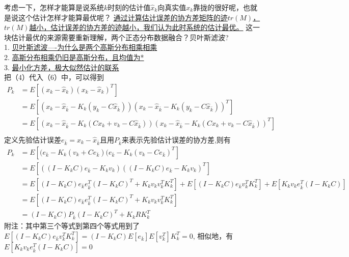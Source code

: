 \documentclass[UTF8,a4paper,10pt]{ctexart}
\begin{document}
    考虑一下，怎样才能算是说系统$k$时刻的估计值$\hat{x}_k$向真实值$x_k$靠拢的很好呢，也就是说这个估计怎样才能算最优呢？
    \uline{通过计算估计误差的协方差矩阵的迹$tr(M)$，$tr(M)$越小，估计误差的协方差的迹越小，我们认为此时系统的估计最优。}
    这一块估计最优的来源需要重新理解，两个正态分布数据融合？贝叶斯滤波?\\    
    1. \href{https://blog.csdn.net/varyshare/article/details/97642209}{贝叶斯滤波----为什么是两个高斯分布相乘相乘}\\
    2. \href{https://blog.csdn.net/michaelhan3/article/details/85453368}{高斯分布相乘仍旧是高斯分布，且均值为*}\\
    3. \href{https://zhuanlan.zhihu.com/p/105496881}{最小化方差，极大似然估计的联系}\\

    把（4）代入（6）中，可以得到
    \begin{equation}
        \begin{aligned}
            P_k &= E[(x_k - \hat{x}_k)(x_k - \hat{x}_k)^T]\\
              &= E[(x_k - \hat{x}_{\bar{k}} - K_k(y_k- C\hat{x}_{\bar{k}})) (x_k - \hat{x}_{\bar{k}} - K_k(y_k- C\hat{x}_{\bar{k}}))^T]\\
              &= E[(x_k - \hat{x}_{\bar{k}} - K_k(Cx_{k} + v_{k}- C\hat{x}_{\bar{k}})) (x_k - \hat{x}_{\bar{k}} - K_k(Cx_{k} + v_{k}- C\hat{x}_{\bar{k}}))^T]\\
        \end{aligned}
    \end{equation}
    定义先验估计误差$e_{\bar{k}} = x_k - \hat{x}_{\bar{k}}$且用$P_{\bar{k}}$来表示先验估计误差的协方差,则有
    \begin{equation}
        \begin{aligned}
            P_k  & = E[(e_{\bar{k}} - K_k(v_k + Ce_{\bar{k}}) (e_{\bar{k}} - K_k(v_k- Ce_{\bar{k}})^T]\\
                  & = E[((I-K_kC)e_{\bar{k}} -K_kv_k) ((I-K_kC)e_{\bar{k}} -K_kv_k)^T]\\
                  & = E[(I-K_kC)e_{\bar{k}}e^T_{\bar{k}}(I-K_kC)^T +  K_kv_kv^T_kK^T_k]
                    + E[(I-K_kC)e_{\bar{k}}v^T_k K^T_k] + E[K_kv_ke^T_{\bar{k}}(I-K_kC)]\\
                  & = E[(I-K_kC)e_{\bar{k}}e^T_{\bar{k}}(I-K_kC)^T +  K_kv_kv^T_kK^T_k]\\
                  & = (I-K_kC)P_{\bar{k}}(I-K_kC)^T + K_kRK^T_k
        \end{aligned}
    \end{equation}
    附注：其中第三个等式到第四个等式用到了
    $E[(I-K_kC)e_{\bar{k}}v^T_k K^T_k] = (I-K_kC)E [e_{\bar{k}}]E[v^T_k]K^T_k = 0$,
    相似地，有$E[K_kv_ke^T_{\bar{k}}(I-K_kC)]=0$
\end{document}
